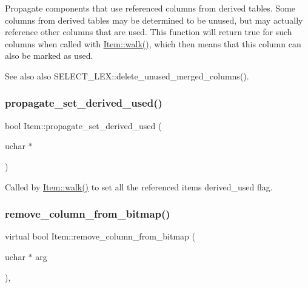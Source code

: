 Propagate components that use referenced columns from derived tables. Some columns from derived tables may be determined to be unused, but may actually reference other columns that are used. This function will return true for such columns when called with \mbox{\hyperlink{classItem_ab7d2529511c14a77e59a1b1bbabc95d7}{Item\+::walk()}}, which then means that this column can also be marked as used. \begin{DoxySeeAlso}{See also}
also S\+E\+L\+E\+C\+T\+\_\+\+L\+E\+X\+::delete\+\_\+unused\+\_\+merged\+\_\+columns(). 
\end{DoxySeeAlso}
\mbox{\label{classItem_ae91bed467907fd1e3720f7caaaba120f}} 
\subsubsection{\texorpdfstring{propagate\+\_\+set\+\_\+derived\+\_\+used()}{propagate\_set\_derived\_used()}}
{\footnotesize\ttfamily bool Item\+::propagate\+\_\+set\+\_\+derived\+\_\+used (\begin{DoxyParamCaption}\item[{uchar $\ast$}]{ }\end{DoxyParamCaption})\hspace{0.3cm}{\ttfamily [inline]}}

Called by \mbox{\hyperlink{classItem_ab7d2529511c14a77e59a1b1bbabc95d7}{Item\+::walk()}} to set all the referenced items\textquotesingle{} derived\+\_\+used flag. \mbox{\label{classItem_a46a9fb3471a7a0b846ce9487dce470b2}} 
\subsubsection{\texorpdfstring{remove\+\_\+column\+\_\+from\+\_\+bitmap()}{remove\_column\_from\_bitmap()}}
{\footnotesize\ttfamily virtual bool Item\+::remove\+\_\+column\+\_\+from\+\_\+bitmap (\begin{DoxyParamCaption}\item[{uchar $\ast$}]{arg }\end{DoxyParamCaption})\hspace{0.3cm}{\ttfamily [inline]}, {\ttfamily [virtual]}}

